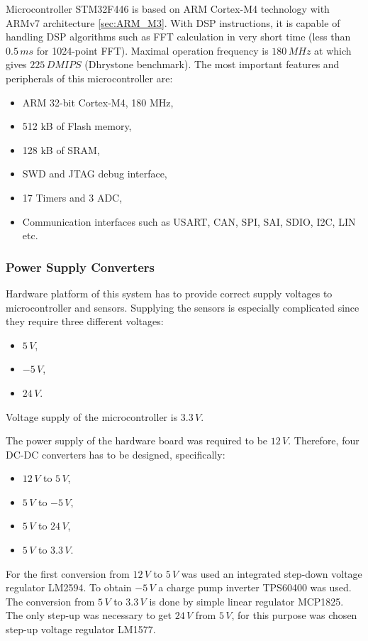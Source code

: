 \documentclass[twoside]{ctuthesis}
\theoremstyle{plain}
\theoremstyle{definition}
\theoremstyle{note}
\begin{document}
Microcontroller STM32F446 is based on ARM Cortex-M4 technology with ARMv7 architecture \ref{sec:ARM_M3}. With DSP instructions, it is capable of handling DSP algorithms such as FFT calculation in very short time (less than $0.5\,ms$ for 1024-point FFT). Maximal operation frequency is $180\,MHz$ at which gives $225\,DMIPS$ (Dhrystone benchmark). The most important features and peripherals of this microcontroller are:
\begin{itemize}
	\setlength{\itemsep}{5pt}
	\item ARM 32-bit Cortex-M4, 180 MHz,
	\item 512 kB of Flash memory,
	\item 128 kB of SRAM,
	\item SWD and JTAG debug interface,
	\item 17 Timers and 3 ADC,
	\item Communication interfaces such as USART, CAN, SPI, SAI, SDIO, I2C, LIN etc.
\end{itemize}    
\subsubsection{Power Supply Converters}
Hardware platform of this system has to provide correct supply voltages to microcontroller and sensors. Supplying the sensors is especially complicated since they require three different voltages:
\begin{itemize}
	\setlength{\itemsep}{5pt}
	\item $5\,V$,
	\item $-5\,V$,
	\item $24\,V$.
\end{itemize}
Voltage supply of the microcontroller is $3.3\,V$.

The power supply of the hardware board was required to be $12\,V$. Therefore, four DC-DC converters has to be designed, specifically:
\begin{itemize}
	\setlength{\itemsep}{5pt}
	\item $12\,V$ to $5\,V$,
	\item $5\,V$ to $-5\,V$,
	\item $5\,V$ to $24\,V$,
	\item $5\,V$ to $3.3\,V$.
\end{itemize}

For the first conversion from $12\,V$ to $5\,V$ was used an integrated step-down voltage regulator LM2594. To obtain $-5\,V$ a charge pump inverter TPS60400 was used. The conversion from $5\,V$ to $3.3\,V$ is done by simple linear regulator MCP1825. The only step-up was necessary to get $24\,V$ from $5\,V$, for this purpose was chosen step-up voltage regulator LM1577.
\end{document}
